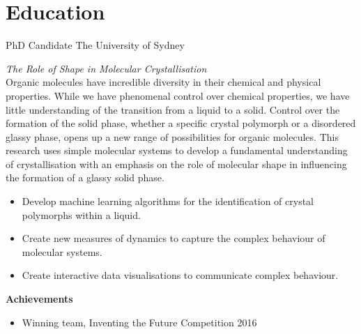 



\makecvtitle{}

\vspace{-4em}
\section{Education}

{PhD Candidate}
{The University of Sydney}{}{}
{%
  \emph{The Role of Shape in Molecular Crystallisation}\\

  Organic molecules have incredible diversity in their chemical and physical properties. While we
  have phenomenal control over chemical properties, we have little understanding of the transition
  from a liquid to a solid. Control over the formation of the solid phase, whether a specific
  crystal polymorph or a disordered glassy phase, opens up a new range of possibilities for organic
  molecules. This research uses simple molecular systems to develop a fundamental understanding of
  crystallisation with an emphasis on the role of molecular shape in influencing the formation of a
  glassy solid phase.

  \begin{itemize}
    \item Develop machine learning algorithms for the identification of crystal polymorphs within a
      liquid.
    \item Create new measures of dynamics to capture the complex behaviour of molecular systems.
    \item Create interactive data visualisations to communicate complex behaviour.
  \end{itemize}
  \textbf{Achievements}
  \begin{itemize}
    \item Winning team, Inventing the Future Competition 2016
  \end{itemize}
}
\vspace{1em}


